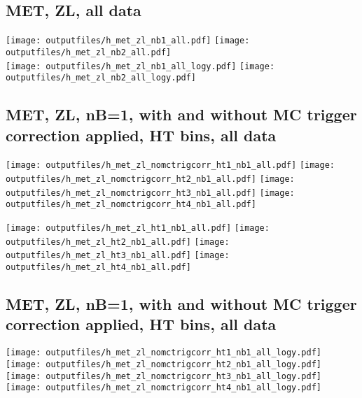 \documentclass[11pt]{article}
\begin{document}
     \subsection{ MET, ZL, all data}

    \noindent
     \texttt{[image: outputfiles/h\_met\_zl\_nb1\_all.pdf]}
     \texttt{[image: outputfiles/h\_met\_zl\_nb2\_all.pdf]} \\

    \noindent
     \texttt{[image: outputfiles/h\_met\_zl\_nb1\_all\_logy.pdf]}
     \texttt{[image: outputfiles/h\_met\_zl\_nb2\_all\_logy.pdf]}

     \subsection{ MET, ZL, nB=1, with and without MC trigger correction applied, HT bins, all data}

    \noindent
     \texttt{[image: outputfiles/h\_met\_zl\_nomctrigcorr\_ht1\_nb1\_all.pdf]}
     \texttt{[image: outputfiles/h\_met\_zl\_nomctrigcorr\_ht2\_nb1\_all.pdf]}
     \texttt{[image: outputfiles/h\_met\_zl\_nomctrigcorr\_ht3\_nb1\_all.pdf]}
     \texttt{[image: outputfiles/h\_met\_zl\_nomctrigcorr\_ht4\_nb1\_all.pdf]}

    \noindent
     \texttt{[image: outputfiles/h\_met\_zl\_ht1\_nb1\_all.pdf]}
     \texttt{[image: outputfiles/h\_met\_zl\_ht2\_nb1\_all.pdf]}
     \texttt{[image: outputfiles/h\_met\_zl\_ht3\_nb1\_all.pdf]}
     \texttt{[image: outputfiles/h\_met\_zl\_ht4\_nb1\_all.pdf]}

    \clearpage
     \subsection{ MET, ZL, nB=1, with and without MC trigger correction applied, HT bins, all data}

    \noindent
     \texttt{[image: outputfiles/h\_met\_zl\_nomctrigcorr\_ht1\_nb1\_all\_logy.pdf]}
     \texttt{[image: outputfiles/h\_met\_zl\_nomctrigcorr\_ht2\_nb1\_all\_logy.pdf]}
     \texttt{[image: outputfiles/h\_met\_zl\_nomctrigcorr\_ht3\_nb1\_all\_logy.pdf]}
     \texttt{[image: outputfiles/h\_met\_zl\_nomctrigcorr\_ht4\_nb1\_all\_logy.pdf]}
\end{document}
